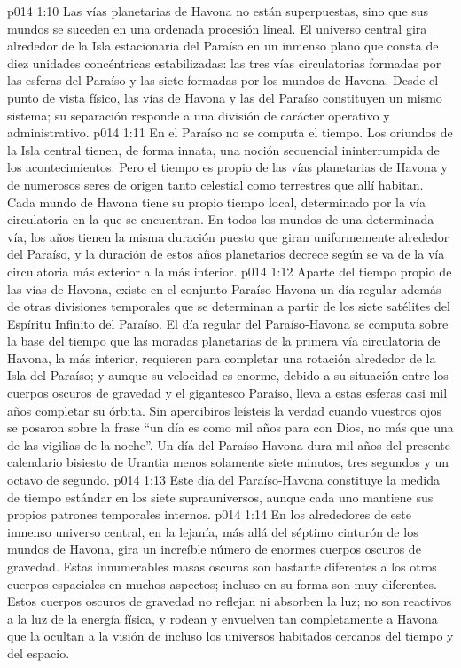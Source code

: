 \vs p014 1:10 Las vías planetarias de Havona no están superpuestas, sino que sus mundos se suceden en una ordenada procesión lineal. El universo central gira alrededor de la Isla estacionaria del Paraíso en un inmenso plano que consta de diez unidades concéntricas estabilizadas: las tres vías circulatorias formadas por las esferas del Paraíso y las siete formadas por los mundos de Havona. Desde el punto de vista físico, las vías de Havona y las del Paraíso constituyen un mismo sistema; su separación responde a una división de carácter operativo y administrativo.
\vs p014 1:11 \pc En el Paraíso no se computa el tiempo. Los oriundos de la Isla central tienen, de forma innata, una noción secuencial ininterrumpida de los acontecimientos. Pero el tiempo es propio de las vías planetarias de Havona y de numerosos seres de origen tanto celestial como terrestres que allí habitan. Cada mundo de Havona tiene su propio tiempo local, determinado por la vía circulatoria en la que se encuentran. En todos los mundos de una determinada vía, los años tienen la misma duración puesto que giran uniformemente alrededor del Paraíso, y la duración de estos años planetarios decrece según se va de la vía circulatoria más exterior a la más interior.
\vs p014 1:12 Aparte del tiempo propio de las vías de Havona, existe en el conjunto Paraíso\hyp{}Havona un día regular además de otras divisiones temporales que se determinan a partir de los siete satélites del Espíritu Infinito del Paraíso. El día regular del Paraíso\hyp{}Havona se computa sobre la base del tiempo que las moradas planetarias de la primera vía circulatoria de Havona, la más interior, requieren para completar una rotación alrededor de la Isla del Paraíso; y aunque su velocidad es enorme, debido a su situación entre los cuerpos oscuros de gravedad y el gigantesco Paraíso, lleva a estas esferas casi mil años completar su órbita. Sin apercibiros leísteis la verdad cuando vuestros ojos se posaron sobre la frase “un día es como mil años para con Dios, no más que una de las vigilias de la noche”. Un día del Paraíso\hyp{}Havona dura mil años del presente calendario bisiesto de Urantia menos solamente siete minutos, tres segundos y un octavo de segundo.
\vs p014 1:13 Este día del Paraíso\hyp{}Havona constituye la medida de tiempo estándar en los siete suprauniversos, aunque cada uno mantiene sus propios patrones temporales internos.
\vs p014 1:14 \pc En los alrededores de este inmenso universo central, en la lejanía, más allá del séptimo cinturón de los mundos de Havona, gira un increíble número de enormes cuerpos oscuros de gravedad. Estas innumerables masas oscuras son bastante diferentes a los otros cuerpos espaciales en muchos aspectos; incluso en su forma son muy diferentes. Estos cuerpos oscuros de gravedad no reflejan ni absorben la luz; no son reactivos a la luz de la energía física, y rodean y envuelven tan completamente a Havona que la ocultan a la visión de incluso los universos habitados cercanos del tiempo y del espacio.
